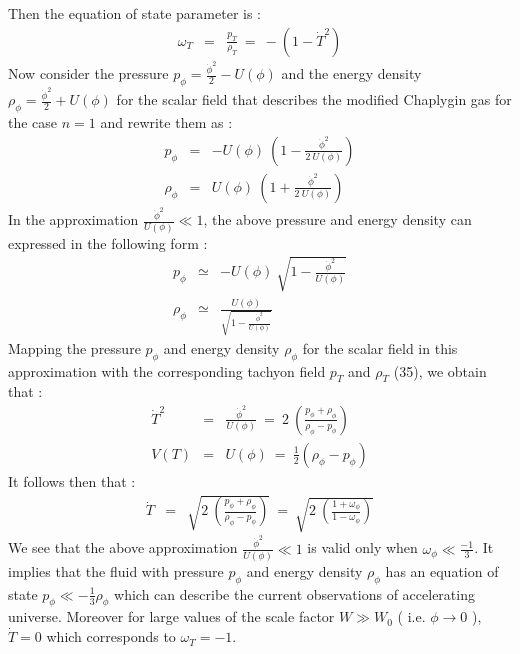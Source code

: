 \documentclass[a4paper,12pt,a4]{article}
\begin{document}
Then the equation of state parameter is : 
\begin{eqnarray}
\omega_T & = & \frac{p_T}{\rho_T}~=~ - \left(1 -  \dot{T}^2 \right) 
\end{eqnarray} 
Now consider the pressure $p_{\phi} = \frac{\dot{\phi}^2}{2} - U (\phi)$ and 
the energy density $\rho_{\phi} = \frac{\dot{\phi}^2}{2} + U (\phi)$ for 
the scalar field that describes the modified Chaplygin gas for 
the case $n=1$ and rewrite them as : 
\begin{eqnarray}
p_{\phi} & = & 
- U (\phi)~ \left( 1 - \frac{\dot{\phi}^2}{2~U (\phi)} \right) \nonumber \\ 
\rho_{\phi} & = & U (\phi)~\left( 1 + \frac{\dot{\phi}^2}{2~U (\phi)} \right) 
\end{eqnarray} 
In the approximation $\frac{\dot{\phi}^2}{U (\phi)} \ll 1$, the above 
pressure and energy density can expressed in the following form : 
\begin{eqnarray}
p_{\phi} & \simeq & - U (\phi)~ 
\sqrt{1 - \frac{\dot{\phi}^2}{U (\phi)}} \nonumber \\ 
\rho_{\phi} & \simeq & 
\frac{U (\phi)}{\sqrt{1 - \frac{\dot{\phi}^2}{U (\phi)}}} 
\end{eqnarray}
Mapping the pressure $p_{\phi}$ and energy density $\rho_{\phi}$ for 
the scalar field in this approximation with the corresponding tachyon 
field $p_T$ and $\rho_T$ (35), we obtain that : 
\begin{eqnarray}
\dot{T}^2 & = & \frac{\dot{\phi}^2}{U (\phi)}~ = ~ 
2~ \left( \frac{p_{\phi} + 
\rho_{\phi}}{\rho_{\phi} - p_{\phi}}  \right) \nonumber \\
V (T) & = & U (\phi)~ = ~ \frac{1}{2} \left( \rho_{\phi} - p_{\phi} \right) 
\end{eqnarray} 
It follows then that : 
\begin{eqnarray}
\dot{T} & = & \sqrt{2~ \left( 
\frac{p_{\phi} + \rho_{\phi}}{\rho_{\phi} - p_{\phi}} \right) }~=~ 
\sqrt{2~ \left(\frac{1 + \omega_{\phi}}{1 - \omega_{\phi}} \right) }
\end{eqnarray} 
We see that the above approximation $\frac{\dot{\phi}^2}{U( \phi)} \ll 1$ 
is valid only when $\omega_{\phi} \ll \frac{- 1}{3}$. It implies that the 
fluid with pressure $p_{\phi}$ and energy density $\rho_{\phi}$ has an 
equation of state $p_{\phi} \ll - \frac{1}{3} \rho_{\phi}$ which can 
describe the current observations of accelerating universe. Moreover for 
large values of the scale factor $W \gg W_0$ ( i.e. $\phi \rightarrow 0$ ), 
$\dot{T} = 0$ which corresponds to $\omega_T = -1$. \\ 
\end{document}

